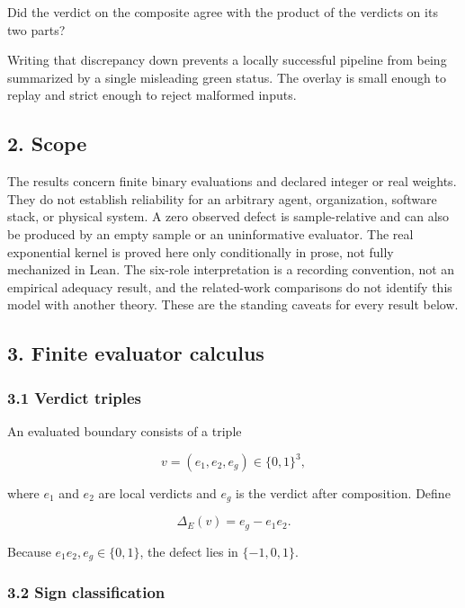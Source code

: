 \documentclass[
  11pt,
]{article}
\theoremstyle{plain}
\theoremstyle{definition}\newtheorem{definition}[theorem]{Definition}
\theoremstyle{remark}\newtheorem*{remark}{Remark}
\renewenvironment{quote}{%
  \begin{mdframed}[linewidth=0pt,leftline=true,linecolor=obrule,
    rightline=false,topline=false,bottomline=false,
    innerleftmargin=1em,innerrightmargin=0.8em,innertopmargin=0.5em,
    innerbottommargin=0.5em,skipabove=0.6em,skipbelow=0.6em,
    backgroundcolor=obboxbg]\small}{\end{mdframed}}
\begin{document}
\begin{quote}
Did the verdict on the composite agree with the product of the verdicts on
its two parts?
\end{quote}

Writing that discrepancy down prevents a locally successful pipeline from
being summarized by a single misleading green status. The overlay is small
enough to replay and strict enough to reject malformed inputs.

\subsection{2. Scope}\label{scope}

The results concern finite binary evaluations and declared integer or real
weights. They do not establish reliability for an arbitrary agent,
organization, software stack, or physical system. A zero observed defect is
sample-relative and can also be produced by an empty sample or an
uninformative evaluator. The real exponential kernel is proved here only
conditionally in prose, not fully mechanized in Lean. The six-role
interpretation is a recording convention, not an empirical adequacy result,
and the related-work comparisons do not identify this model with another
theory. These are the standing caveats for every result below.

\subsection{3. Finite evaluator calculus}\label{finite-evaluator-calculus}

\subsubsection{3.1 Verdict triples}\label{verdict-triples}

An evaluated boundary consists of a triple

\[
v=(e_1,e_2,e_g)\in\{0,1\}^3,
\]

where \(e_1\) and \(e_2\) are local verdicts and \(e_g\) is the verdict after
composition. Define

\[
\Delta_E(v)=e_g-e_1e_2.
\]

Because \(e_1e_2,e_g\in\{0,1\}\), the defect lies in
\(\{-1,0,1\}\).

\subsubsection{3.2 Sign classification}\label{sign-classification}
\end{document}
